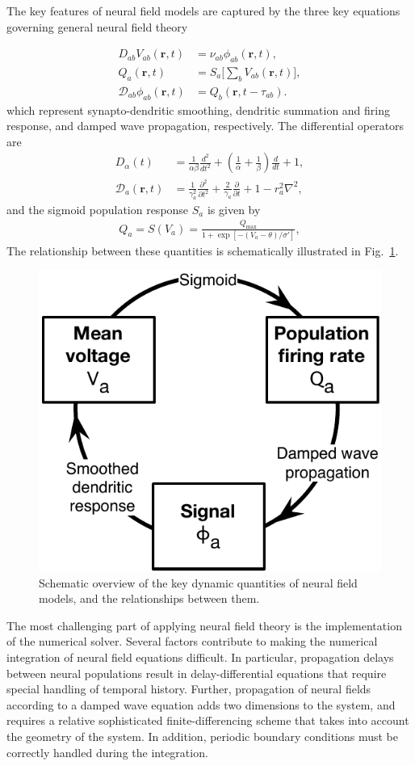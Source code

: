 \documentclass[preprint,review,10pt,authoryear,letterpaper]{elsarticle}
\begin{document}
The key features of neural field models are captured by the three key equations governing general neural field theory

\begin{align*}
	D_{ab}V_{ab}(\mathbf{r},t) &= \nu_{ab}\phi_{ab}(\mathbf{r},t),\\
			Q_a(\mathbf{r},t) &= S_a \big[\sum_b V_{ab}(\mathbf{r},t) \big],\\
	\mathcal{D}_{ab}\phi_{ab}(\mathbf{r},t) &= Q_b(\mathbf{r},t-\tau_{ab}).
\end{align*}
which represent synapto-dendritic smoothing, dendritic summation and firing response, and damped wave propagation, respectively. The differential operators are
\begin{align*}
	D_\alpha(t) &= \frac{1}{\alpha\beta}\frac{d^2}{dt^2} + \left( \frac{1}{\alpha} + \frac{1}{\beta}\right) \frac{d}{dt}+1,\\
	\mathcal{D}_a(\mathbf{r},t) &= \frac{1}{\gamma_a^2}\frac{\partial^2}{\partial t^2} + \frac{2}{\gamma_a}\frac{\partial}{\partial t} + 1 - r_a^2\nabla^2,
\end{align*}
and the sigmoid population response $S_a$ is given by
\begin{align*}
	Q_a = S(V_a) = \frac{Q_{\textrm{max}}}{1+\exp[-(V_a - \theta)/\sigma']},
\end{align*}
The relationship between these quantities is schematically illustrated in Fig.~\ref{fig:eirs_cycle}.

\begin{figure}[!b]
\begin{center}
\includegraphics[width=0.40\columnwidth]{EIRS_cycle}
\caption{Schematic overview of the key dynamic quantities of neural field models, and the relationships between them.}
\label{fig:eirs_cycle}
\end{center}
\end{figure}

The most challenging part of applying neural field theory is the implementation of the numerical solver. Several factors contribute to making the numerical integration of neural field equations difficult. In particular, propagation delays between neural populations result in delay-differential equations that require special handling of temporal history. Further, propagation of neural fields according to a damped wave equation adds two dimensions to the system, and requires a relative sophisticated finite-differencing scheme that takes into account the geometry of the system. In addition, periodic boundary conditions must be correctly handled during the integration. 
\end{document}
